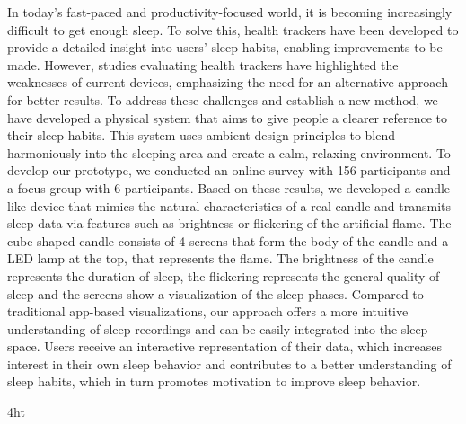 \documentclass[
  a4paper,  %
  twoside,  %
  bibliography=totoc,
  headsepline,
  cleardoublepage=empty,
  parskip=half,
  draft=false
]{scrbook}
\begin{document}
In today's fast-paced and productivity-focused world, it is becoming increasingly difficult to get enough sleep. To solve this, health trackers have been developed to provide a detailed insight into users' sleep habits, enabling improvements to be made. However, studies evaluating health trackers have highlighted the weaknesses of current devices, emphasizing the need for an alternative approach for better results.
To address these challenges and establish a new method, we have developed a physical system that aims to give people a clearer reference to their sleep habits. This system uses ambient design principles to blend harmoniously into the sleeping area and create a calm, relaxing environment.
To develop our prototype, we conducted an online survey with 156 participants and a focus group with 6 participants. Based on these results, we developed a candle-like device that mimics the natural characteristics of a real candle and transmits sleep data via features such as brightness or flickering of the artificial flame. The cube-shaped candle consists of 4 screens that form the body of the candle and a LED lamp at the top, that represents the flame. The brightness of the candle represents the duration of sleep, the flickering represents the general quality of sleep and the screens show a visualization of the sleep phases.
Compared to traditional app-based visualizations, our approach offers a more intuitive understanding of sleep recordings and can be easily integrated into the sleep space. Users receive an interactive representation of their data, which increases interest in their own sleep behavior and contributes to a better understanding of sleep habits, which in turn promotes motivation to improve sleep behavior.

\cleardoublepage



\iftex4ht
\else
\fi

%
%

%
%
%
\tableofcontents
\end{document}
